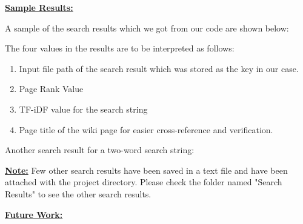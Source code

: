 \documentclass[11pt]{article}
\begin{document}
\textbf{\underline{Sample Results:}}

A sample of the search results which we got from our code are shown below:

\begin{figure}[H]%
	\centering
\end{figure}

The four values in the results are to be interpreted as follows:
\begin{enumerate}

\item Input file path of the search result which was stored as the key in our case.
\item Page Rank Value
\item TF-iDF value for the search string
\item Page title of the wiki page for easier cross-reference and verification.
\end{enumerate}


Another search result for a two-word search string:

\begin{figure}[H]%
	\centering
\end{figure}


\textbf{\underline{Note:}} Few other search results have been saved in a text file and have been attached with the project directory. Please check the folder named "Search Results" to see the other search results.
\newpage

\textbf{\underline{Future Work:}}
\end{document}
